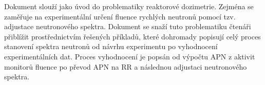 Dokument slouží jako úvod do problematiky reaktorové dozimetrie. Zejména se zaměřuje na experimentální určení fluence rychlých neutronů pomocí tzv. adjustace neutronového spektra. Dokument se snaží tuto problematiku čtenáři přiblížit prostřednictvím řešených příkladů, které dohromady popisují celý proces stanovení spektra neutronů od návrhu experimentu po vyhodnocení experimentálních dat. Proces vyhodnocení je popsán od výpočtu APN z aktivit monitorů fluence po převod APN na RR a následnou adjustaci neutronového spektra.